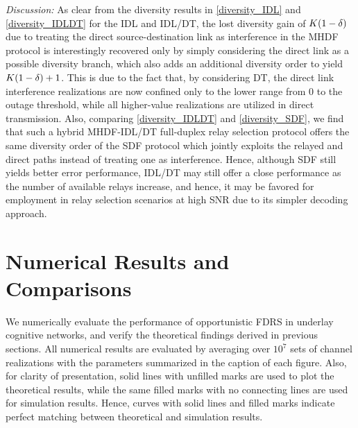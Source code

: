 \documentclass[10pt,journal]{IEEEtran}
\begin{document}
\textit{Discussion:} As clear from the diversity results in \eqref{diversity_IDL} and \eqref{diversity_IDLDT} for the \ac{IDL} and \ac{IDL}/\ac{DT}, the lost diversity gain of $K(1-\delta)$ due to treating the direct source-destination link as interference in the \ac{MHDF} protocol is interestingly recovered only by simply considering the direct link as a possible diversity branch, which also adds an additional diversity order to yield $K(1-\delta)+1$. This is due to the fact that, by considering \ac{DT}, the direct link interference realizations are now confined only to the lower range from $0$ to the outage threshold, while all higher-value realizations are utilized in direct transmission. Also, comparing \eqref{diversity_IDLDT} and \eqref{diversity_SDF}, we find that such a hybrid \ac{MHDF}-\ac{IDL}/\ac{DT} full-duplex relay selection protocol offers the same diversity order of the \ac{SDF} protocol which jointly exploits the relayed and direct paths instead of treating one as interference. Hence, although \ac{SDF} still yields better error performance, \ac{IDL}/\ac{DT} may still offer a close performance as the number of available relays increase, and hence, it may be favored for employment in relay selection scenarios at high \ac{SNR} due to its simpler decoding approach.
\section{Numerical Results and Comparisons}
%
We numerically evaluate the performance of opportunistic \ac{FDRS} in underlay cognitive networks, and verify the theoretical findings derived in previous sections. All numerical results are evaluated by averaging over $10^7$ sets of channel realizations with the parameters summarized in the caption of each figure. Also, for clarity of presentation, solid lines with unfilled marks are used to plot the theoretical results, while the same filled marks with no connecting lines are used for simulation results. Hence, curves with solid lines and filled marks indicate perfect matching between theoretical and simulation results.
\end{document}
